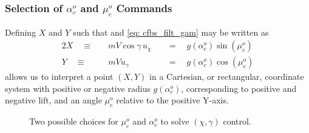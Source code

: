 \documentclass[12pt]{ucthesis}
\begin{document}
\subsubsection{\texorpdfstring{Selection of $\alpha^o_c$ and $\mu^o_c$ Commands}{Selection of Angle-of-Attack and Roll Commands}}
\label{subsubsec: alph_mu}
%
Defining $X$ and $Y$ such that  and \ref{eq: cfbs_filt_gam} may be written as
	\begin{alignat}{2}
		\label{eq: cfbs_X}	X \quad \equiv & \quad m V\cos\gamma\,{u_{\chi}}&\quad=\quad g(\alpha^o_c) \sin(\mu^o_c)\\
		\label{eq: cfbs_Y}	Y \quad \equiv & \quad m V{u_{\gamma}}  		&\quad=\quad g(\alpha^o_c) \cos(\mu^o_c)
	\end{alignat}
allows us to interpret a point $(X,Y)$ in a Cartesian, or rectangular, coordinate system with positive or negative radius $g(\alpha^o_c)$, corresponding to positive and negative lift, and an angle $\mu^o_c$ relative to the positive Y-axis.
	\begin{figure}[t]
		\centering %
		\caption{Two possible choices for $\mu^o_c$ and $\alpha^o_c$ to solve $(\chi,\gamma)$ control. \citep{Farrell2006}}
		\label{fig: geom_soln}
	\end{figure}
\end{document}
